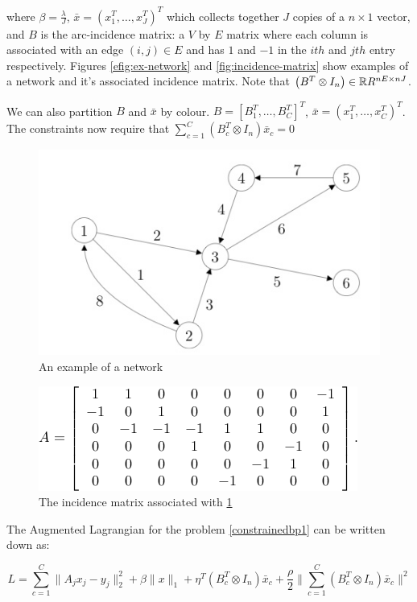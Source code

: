 \documentclass{article}
\begin{document}
where \(\beta = \frac{\lambda}{J}\), \( \bar{x} = \left(x_1^T, \ldots, x_J^T\right)^T \) which collects together \(J\) copies of a \(n\times 1\) vector, and \(B\) is the arc-incidence matrix: a \(V\) by \(E\) matrix where each column is associated with an edge \(\left(i,j\right) \in E\) and has \(1\) and \(-1\) in the \(ith\) and \(jth\) entry respectively. Figures \eqref{efig:ex-network} and \eqref{fig:incidence-matrix} show examples of a network and it's associated incidence matrix. Note that \(\left(B^T\otimes I_n \right) \in {\mathbb{R}}{R}^{nE \times nJ}\). 

We can also partition \(B\) and \(\bar{x}\) by colour. \( B = \left[B_1^T,\ldots , B_C^T\right]^T\),  \( \bar{x} = \left(x_1^T, \ldots, x_C^T\right)^T \). The constraints now require that \(\sum_{c=1}^C \left(B_c^T \otimes I_n\right)\bar{x}_c = 0\)

\begin{figure}[h]
\centering
\includegraphics[height = 5 cm]{network-ex-incidence-mat.jpg}
\caption{An example of a network}
\label{efig:ex-network}
\end{figure}

\begin{figure}[h]
\centering
\includegraphics[height = 3 cm]{ex-incidencematrix.png}
\caption{The incidence matrix associated with \ref{efig:ex-network}}
\label{fig:incidence-matrix}
\end{figure}

The Augmented Lagrangian for the problem \eqref{constrainedbp1} can be written down as:

\begin{equation}
L = \sum_{c=1}^C \|A_jx_j - y_j\|_2^2 + \beta\|x\|_1 + \eta^T\left(B_c^T \otimes I_n\right)\bar{x}_c + \frac{\rho}{2}\|\sum_{c=1}^C \left(B_c^T \otimes I_n\right)\bar{x}_c\|^2
\end{equation}
\end{document}

